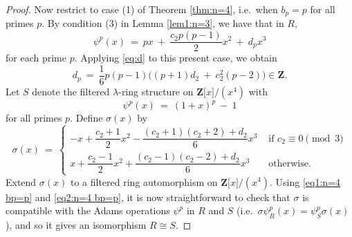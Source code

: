 \documentclass[reqno,11pt]{amsart}
\numberwithin{equation}{subsection}  %
\newcommand{\bZ}{\mathbf{Z}}
\begin{document}
\begin{proof}
Now restrict to case (1) of Theorem \ref{thm:n=4}, i.e.\ when $b_p = p$ for all primes $p$.  By condition (3) in Lemma \ref{lem1:n=3}, we have that in $R$,
   \begin{equation}
   \label{eq1:n=4 bp=p}
   \psi^p(x) ~=~ px ~+~ \frac{c_2 p(p-1)}{2}x^2 ~+~ d_p x^3
   \end{equation}
for each prime $p$. Applying \eqref{eq:d} to this present case, we obtain
   \begin{equation}
   \label{eq2:n=4 bp=p}
   d_p ~=~ \frac{1}{6}p(p - 1)\bigl((p + 1)d_2 ~+~ c_2^2(p - 2)\bigr) \in \bZ.
   \end{equation}
Let $S$ denote the filtered $\lambda$-ring structure on $\bZ \lbrack x \rbrack/(x^4)$ with 
   \[
   \psi^p(x) ~=~ (1 + x)^p ~-~ 1
   \]
for all primes $p$.  Define $\sigma(x)$ by
   \[
   \sigma(x) ~=~ \begin{cases}
                 -x + \dfrac{c_2 + 1}{2}x^2 - \dfrac{(c_2 + 1)(c_2 + 2) + d_2}{6}x^3 & \text{ if } c_2 \equiv 0 \pmod 3 \\
                 x + \dfrac{c_2 - 1}{2}x^2 + \dfrac{(c_2 - 1)(c_2 - 2) + d_2}{6}x^3 & \text{ otherwise}. \end{cases}
   \]
Extend $\sigma(x)$ to a filtered ring automorphism on $\bZ \lbrack x \rbrack/(x^4)$.  Using \eqref{eq1:n=4 bp=p} and \eqref{eq2:n=4 bp=p}, it is now straightforward to check that $\sigma$ is compatible with the Adams operations $\psi^p$ in $R$ and $S$ (i.e.\ $\sigma \psi^p_R(x) = \psi^p_S\sigma(x)$), and so it gives an isomorphism $R \cong S$.
\end{proof}



\end{document}

